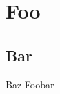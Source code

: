 \documentclass{beamer}
\begin{document}
\section{Foo}
\subsection{Bar}

\begin{frame}{Baz}
  Foobar
\end{frame}
\end{document}
